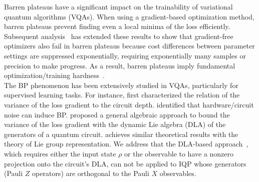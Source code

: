 \documentclass{article}
\theoremstyle{plain}
\theoremstyle{definition}
\theoremstyle{remark}
\begin{document}
Barren plateaus have a significant impact on the trainability of variational quantum algorithms (VQAs). When using a gradient-based optimization method, barren plateaus prevent finding even a local minima of the loss efficiently. Subsequent analysis~\cite{Holmes22} has extended these results to show that gradient-free optimizers also fail in barren plateaus because cost differences between parameter settings are suppressed exponentially, requiring exponentially many samples or precision to make progress. As a result, barren plateaus imply fundamental optimization/training hardness~\cite{Larocca25}.\\
The BP phenomenon has been extensively studied in VQAs, particularly for supervised learning tasks. For instance, \citet{Cerezo21} first characterized the relation of the variance of the loss gradient to the circuit depth. \citet{Wang21} identified that hardware/circuit noise can induce BP. \citet{Ragone24} proposed a general algebraic approach to bound the variance of the loss gradient with the dynamic Lie algebra (DLA) of the generators of a quantum circuit. \citet{fontana2024characterizing} achieves similar theoretical results with the theory of Lie group representation. We address that the DLA-based approach~\cite{Ragone24}, which requires either the input state $\rho$ or the observable to have a nonzero projection onto the circuit's DLA, can not be applied to IQP whose generators (Pauli $Z$ operators) are orthogonal to the Pauli $X$ observables.
\end{document}
